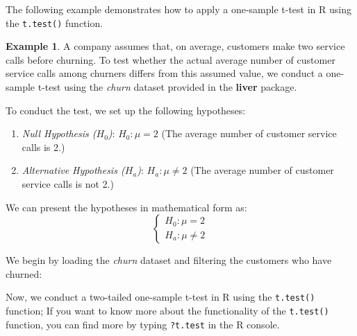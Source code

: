 \documentclass[
  11pt,
]{book}
\makeatletter
\newenvironment{Shaded}{}{}
\newcommand{\CommentTok}[1]{\textcolor[rgb]{0.36,0.36,0.36}{#1}}
\newcommand{\FunctionTok}[1]{#1}
\newcommand{\NormalTok}[1]{#1}
\newcommand{\OtherTok}[1]{\textcolor[rgb]{0.39,0.39,0.39}{#1}}
\newcommand{\SpecialCharTok}[1]{\textcolor[rgb]{0.39,0.39,0.39}{#1}}
\newcommand{\StringTok}[1]{\textcolor[rgb]{0.39,0.39,0.39}{#1}}
\providecommand{\tightlist}{%
  \setlength{\itemsep}{0pt}\setlength{\parskip}{0pt}}
\newenvironment{kframe}{%
\medskip{}
\setlength{\fboxsep}{.8em}
 \def\at@end@of@kframe{}%
 \ifinner\ifhmode%
  \def\at@end@of@kframe{\end{minipage}}%
  \begin{minipage}{\columnwidth}%
 \fi\fi%
 \def\FrameCommand##1{\hskip\@totalleftmargin \hskip-\fboxsep
 \colorbox{shadecolor}{##1}\hskip-\fboxsep
     \hskip-\linewidth \hskip-\@totalleftmargin \hskip\columnwidth}%
 \MakeFramed {\advance\hsize-\width
   \@totalleftmargin\z@ \linewidth\hsize
   \@setminipage}}%
 {\par\unskip\endMakeFramed%
 \at@end@of@kframe}
\renewenvironment{Shaded}{\begin{kframe}}{\end{kframe}}
\theoremstyle{definition}
\theoremstyle{definition}
\newtheorem{example}{Example}[chapter]
\theoremstyle{definition}
\theoremstyle{definition}
\theoremstyle{remark}
\makeatother
\begin{document}
The following example demonstrates how to apply a one-sample t-test in R using the \texttt{t.test()} function.

\begin{example}
\protect\hypertarget{exm:ex-one-sample-test}{}\label{exm:ex-one-sample-test}A company assumes that, on average, customers make two service calls before churning. To test whether the actual average number of customer service calls among churners differs from this assumed value, we conduct a one-sample t-test using the \emph{churn} dataset provided in the \textbf{liver} package.

To conduct the test, we set up the following hypotheses:

\begin{enumerate}
\def\labelenumi{\arabic{enumi}.}
\tightlist
\item
  \emph{Null Hypothesis (\(H_0\))}: \(H_0: \mu = 2\) (The average number of customer service calls is 2.)\\
\item
  \emph{Alternative Hypothesis (\(H_a\))}: \(H_a: \mu \neq 2\) (The average number of customer service calls is not 2.)
\end{enumerate}

We can present the hypotheses in mathematical form as:
\[
\begin{cases}
    H_0: \mu = 2   \\
    H_a: \mu \neq 2  
\end{cases}
\]

We begin by loading the \emph{churn} dataset and filtering the customers who have churned:

\begin{Shaded}
\end{Shaded}

Now, we conduct a two-tailed one-sample t-test in R using the \texttt{t.test()} function; If you want to know more about the functionality of the \texttt{t.test()} function, you can find more by typing \texttt{?t.test} in the R console.


\end{example}
\end{document}
